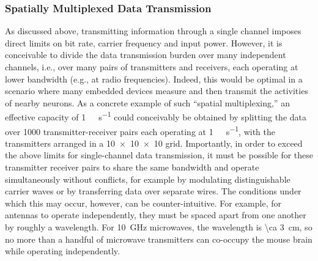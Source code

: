 \subsubsection{Spatially Multiplexed Data Transmission}

As discussed above, transmitting information through a single channel imposes direct limits on bit rate, carrier frequency and input power.
However, it is conceivable to divide the data transmission burden over many independent channels, i.e., over many pairs of transmitters and receivers, each operating at lower bandwidth (e.g., at radio frequencies).
Indeed, this would be optimal in a scenario where many embedded devices measure and then transmit the activities of nearby neurons.
As a concrete example of such ``spatial multiplexing,'' an effective capacity of \SI{1}{\tera\bit\per\second} could conceivably be obtained by splitting the data over \num{1000} transmitter-receiver pairs each operating at \SI{1}{\giga\bit\per\second}, with the transmitters arranged in a \num{10 x 10 x 10} grid.
Importantly, in order to exceed the above limits for single-channel data transmission, it must be possible for these transmitter receiver pairs to share the same bandwidth and operate simultaneously without conflicts, for example by modulating distinguishable carrier waves or by transferring data over separate wires.
The conditions under which this may occur, however, can be counter-intuitive.
For example, for antennas to operate independently, they must be spaced apart from one another by roughly a wavelength.
For \SI{10}{\giga\hertz} microwaves, the wavelength is \SI{\ca 3}{\centi\meter}, so no more than a handful of microwave transmitters can co-occupy the mouse brain while operating independently.

